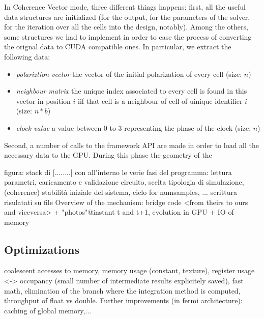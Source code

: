 In Coherence Vector mode, three different things happens: first, all the useful data structures are initialized (for the output, for the parameters of the solver, for the iteration over all the cells into the design, notably). Among the others, some structures we had to implement in order to ease the process of converting the orignal data to CUDA compatible ones. In particular, we extract the following data:
\begin{itemize}
\item \textsl{polariztion vector} the vector of the initial polarization of every cell  (size: $n$)
\item \textsl{neighbour matrix} the unique index associated to every cell is found in this vector in position $i$ iif that cell is a neighbour of cell of uinique identifier $i$  (size: $n*b$)
\item \textsl{clock value} a value between 0 to 3 representing the phase of the clock (size: $n$)
\end{itemize}
Second, a number of calls to the framework API are made in order to load all the necessary data to the GPU. During this phase the geometry of the 

figura: stack di [........] con all'interno le verie fasi del programma: lettura parametri, caricamento e validazione circuito, scelta tipologia di simulazione, (coherence) stabilità iniziale del sistema, ciclo for numsamples, ... scrittura risulatati su file
Overview of the mechanism: bridge code <from theirs to ours and viceversa> + "photos"@instant t and t+1, evolution in GPU + IO of memory
\subsection{Optimizations}
coalescent accesses to memory, memory usage (constant, texture), register usage <-> occupancy (small number of intermediate results explicitely saved), fast math, elimination of the branch where the integration method is computed, throughput of float vs double. Further improvements (in fermi architecture): caching of global memory,...
